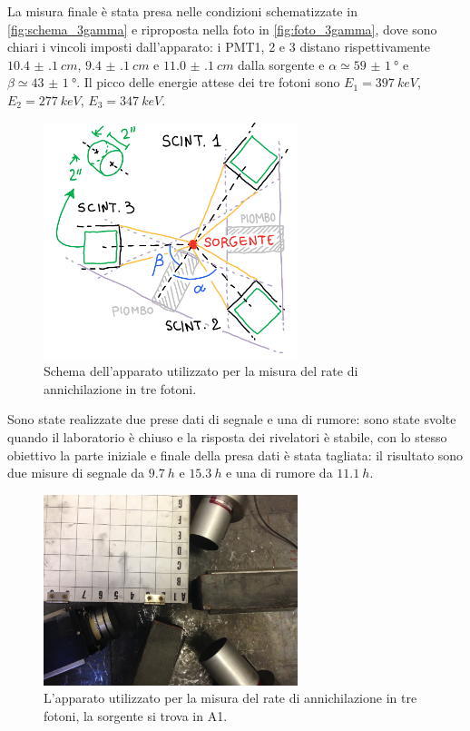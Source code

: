 La misura finale è stata presa nelle condizioni schematizzate in \autoref{fig:schema_3gamma} e riproposta nella foto in \autoref{fig:foto_3gamma}, dove sono chiari i vincoli imposti dall'apparato: i PMT1, 2 e 3 distano rispettivamente $\SI{10.4(1)}{cm}$, $\SI{9.4(1)}{cm}$ e $\SI{11.0(1)}{cm}$  dalla sorgente e $\alpha \simeq \SI{59(1)}{\degree}$ e $\beta \simeq \SI{43(1)}{\degree}$. Il picco delle energie attese dei tre fotoni sono $E_1= \SI{397}{keV}$, $E_2 =\SI{277}{keV}$, $E_3=\SI{347}{keV}$.
 \begin{figure}[h]
	\centering
	\includegraphics[width=20em]{immagini/schema3gamma}
	\caption{\label{fig:3gamma_signal} Schema dell'apparato utilizzato per la misura del rate di annichilazione in tre fotoni.}
	\label{fig:foto_3gamma}
\end{figure}
Sono state realizzate due prese dati di segnale e una di rumore: sono state svolte quando il laboratorio è chiuso e la risposta dei rivelatori è stabile, con lo stesso obiettivo la parte iniziale e finale della presa dati è stata tagliata: il risultato sono due misure di segnale da $\SI{9.7}{h}$ e $\SI{15.3}{h}$ e una di rumore da $\SI{11.1}{h}$.
 \begin{figure}[h]
	\centering
	\includegraphics[width=20em]{immagini/3gamma_foto}
	\caption{\label{fig:3gamma_signal} L'apparato utilizzato per la misura del rate di annichilazione in tre fotoni, la sorgente si trova in A1.}
	\label{fig:foto_3gamma}
\end{figure}

